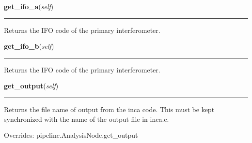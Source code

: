     \label{inspiral:IncaNode:get_ifo_a}
    \vspace{0.5ex}

    \noindent\begin{boxedminipage}{\textwidth}

    \raggedright \textbf{get\_ifo\_a}(\textit{self})

    \vspace{-1.5ex}

    \rule{\textwidth}{0.5\fboxrule}
    Returns the IFO code of the primary interferometer.

    \vspace{1ex}

    \end{boxedminipage}

    \label{inspiral:IncaNode:get_ifo_b}
    \vspace{0.5ex}

    \noindent\begin{boxedminipage}{\textwidth}

    \raggedright \textbf{get\_ifo\_b}(\textit{self})

    \vspace{-1.5ex}

    \rule{\textwidth}{0.5\fboxrule}
    Returns the IFO code of the primary interferometer.

    \vspace{1ex}

    \end{boxedminipage}

    \label{inspiral:IncaNode:get_output}
    \vspace{0.5ex}

    \noindent\begin{boxedminipage}{\textwidth}

    \raggedright \textbf{get\_output}(\textit{self})

    \vspace{-1.5ex}

    \rule{\textwidth}{0.5\fboxrule}
    Returns the file name of output from the inca code. This must be kept 
    synchronized with the name of the output file in inca.c.

    \vspace{1ex}

      Overrides: pipeline.AnalysisNode.get\_output

    \end{boxedminipage}

